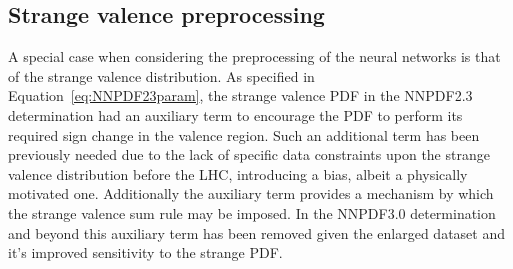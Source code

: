 %
%

\subsection{Strange valence preprocessing}
A special case when considering the preprocessing of the neural networks is that of the strange valence distribution. As specified in Equation~\ref{eq:NNPDF23param}, the strange valence PDF in the NNPDF2.3 determination had an auxiliary term to encourage the PDF to perform its required sign change in the valence region. Such an additional term has been previously needed due to the lack of specific data constraints upon the strange valence distribution before the LHC, introducing a bias, albeit a physically motivated one. Additionally the auxiliary term provides a mechanism by which the strange valence sum rule may be imposed. In the NNPDF3.0 determination and beyond this auxiliary term has been removed given the enlarged dataset and it's improved sensitivity to the strange PDF.

